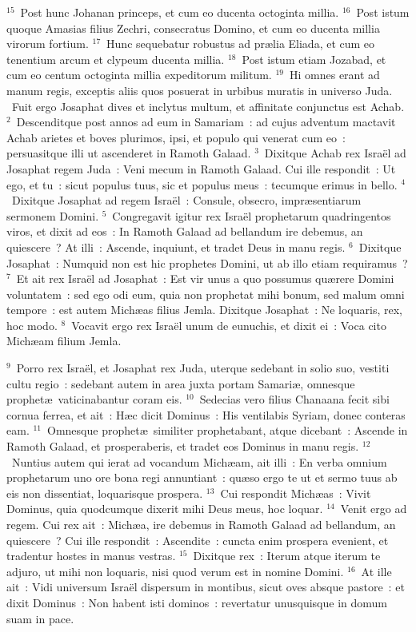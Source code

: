 ${}^{15}$~Post hunc Johanan princeps, et cum eo ducenta octoginta millia.
${}^{16}$~Post istum quoque Amasias filius Zechri, consecratus Domino, et cum eo ducenta millia virorum fortium.
${}^{17}$~Hunc sequebatur robustus ad pr\ae lia Eliada, et cum eo tenentium arcum et clypeum ducenta millia.
${}^{18}$~Post istum etiam Jozabad, et cum eo centum octoginta millia expeditorum militum.
${}^{19}$~Hi omnes erant ad manum regis, exceptis aliis quos posuerat in urbibus muratis in universo Juda.
~\lettrine[lines=10,image=true,loversize=0.05,lraise=-0.03]{F}{}uit ergo Josaphat dives et inclytus multum, et affinitate conjunctus est Achab.
${}^{2}$~Descenditque post annos ad eum in Samariam~: ad cujus adventum mactavit Achab arietes et boves plurimos, ipsi, et populo qui venerat cum eo~: persuasitque illi ut ascenderet in Ramoth Galaad.
${}^{3}$~Dixitque Achab rex Isra\"el ad Josaphat regem Juda~: Veni mecum in Ramoth Galaad. Cui ille respondit~: Ut ego, et tu~: sicut populus tuus, sic et populus meus~: tecumque erimus in bello.
${}^{4}$~Dixitque Josaphat ad regem Isra\"el~: Consule, obsecro, impr\ae sentiarum sermonem Domini.
${}^{5}$~Congregavit igitur rex Isra\"el prophetarum quadringentos viros, et dixit ad eos~: In Ramoth Galaad ad bellandum ire debemus, an quiescere~? At illi~: Ascende, inquiunt, et tradet Deus in manu regis.
${}^{6}$~Dixitque Josaphat~: Numquid non est hic prophetes Domini, ut ab illo etiam requiramus~?
${}^{7}$~Et ait rex Isra\"el ad Josaphat~: Est vir unus a quo possumus qu\ae rere Domini voluntatem~: sed ego odi eum, quia non prophetat mihi bonum, sed malum omni tempore~: est autem Mich\ae as filius Jemla. Dixitque Josaphat~: Ne loquaris, rex, hoc modo.
${}^{8}$~Vocavit ergo rex Isra\"el unum de eunuchis, et dixit ei~: Voca cito Mich\ae am filium Jemla.


${}^{9}$~Porro rex Isra\"el, et Josaphat rex Juda, uterque sedebant in solio suo, vestiti cultu regio~: sedebant autem in area juxta portam Samari\ae , omnesque prophet\ae\ vaticinabantur coram eis.
${}^{10}$~Sedecias vero filius Chanaana fecit sibi cornua ferrea, et ait~: H\ae c dicit Dominus~: His ventilabis Syriam, donec conteras eam.
${}^{11}$~Omnesque prophet\ae\ similiter prophetabant, atque dicebant~: Ascende in Ramoth Galaad, et prosperaberis, et tradet eos Dominus in manu regis.
${}^{12}$~Nuntius autem qui ierat ad vocandum Mich\ae am, ait illi~: En verba omnium prophetarum uno ore bona regi annuntiant~: qu\ae so ergo te ut et sermo tuus ab eis non dissentiat, loquarisque prospera.
${}^{13}$~Cui respondit Mich\ae as~: Vivit Dominus, quia quodcumque dixerit mihi Deus meus, hoc loquar.
${}^{14}$~Venit ergo ad regem. Cui rex ait~: Mich\ae a, ire debemus in Ramoth Galaad ad bellandum, an quiescere~? Cui ille respondit~: Ascendite~: cuncta enim prospera evenient, et tradentur hostes in manus vestras.
${}^{15}$~Dixitque rex~: Iterum atque iterum te adjuro, ut mihi non loquaris, nisi quod verum est in nomine Domini.
${}^{16}$~At ille ait~: Vidi universum Isra\"el dispersum in montibus, sicut oves absque pastore~: et dixit Dominus~: Non habent isti dominos~: revertatur unusquisque in domum suam in pace.


